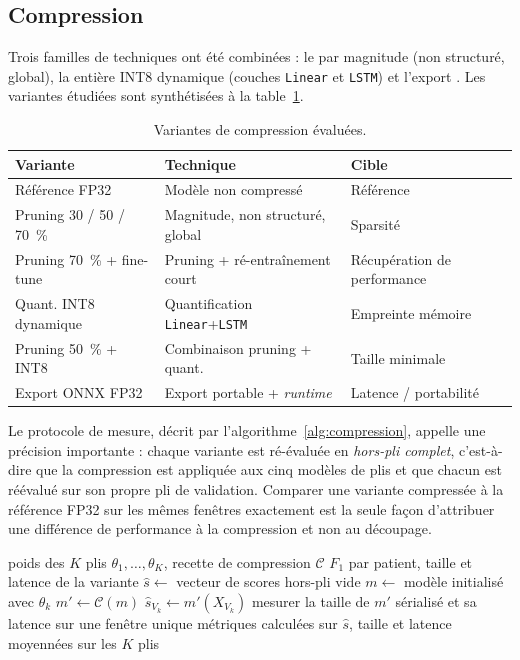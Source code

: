 \subsection{Compression}
Trois familles de techniques ont été combinées : le  par magnitude (non structuré, global), la  entière INT8 dynamique (couches \texttt{Linear} et \texttt{LSTM}) et l'export . Les variantes étudiées sont synthétisées à la table~\ref{tab:meth:compression}.

\begin{table}[H]
  \centering
  \caption{Variantes de compression évaluées.}
  \label{tab:meth:compression}
  \begin{tabular}{lll}
    \toprule
    \textbf{Variante} & \textbf{Technique} & \textbf{Cible} \\
    \midrule
    Référence FP32              & Modèle non compressé              & Référence \\
    Pruning 30 / 50 / 70~\%     & Magnitude, non structuré, global  & Sparsité \\
    Pruning 70~\% + fine-tune   & Pruning + ré-entraînement court   & Récupération de performance \\
    Quant. INT8 dynamique       & Quantification \texttt{Linear}+\texttt{LSTM} & Empreinte mémoire \\
    Pruning 50~\% + INT8        & Combinaison pruning + quant.      & Taille minimale \\
    Export ONNX FP32            & Export portable + \textit{runtime} & Latence / portabilité \\
    \bottomrule
  \end{tabular}
\end{table}

Le protocole de mesure, décrit par l'algorithme~\ref{alg:compression}, appelle une précision importante : chaque variante est ré-évaluée en \emph{hors-pli complet}, c'est-à-dire que la compression est appliquée aux cinq modèles de plis et que chacun est réévalué sur son propre pli de validation. Comparer une variante compressée à la référence FP32 sur les mêmes fenêtres exactement est la seule façon d'attribuer une différence de performance à la compression et non au découpage.

\begin{algorithm}[H]
\caption{Évaluation d'une variante de compression}
\label{alg:compression}
\begin{algorithmic}[1]
\Require poids des \(K\) plis \(\theta_1, \dots, \theta_K\), recette de compression \(\mathcal{C}\)
\Ensure \(F_1\) par patient, taille et latence de la variante
\State \(\hat{s} \gets\) vecteur de scores hors-pli vide
  \State \(m \gets\) modèle initialisé avec \(\theta_k\)
  \State \(m' \gets \mathcal{C}(m)\) 
  \State \(\hat{s}_{V_k} \gets m'(X_{V_k})\) 
  \State mesurer la taille de \(m'\) sérialisé et sa latence sur une fenêtre unique
\EndFor
\State \Return métriques calculées sur \(\hat{s}\), taille et latence moyennées sur les \(K\) plis
\end{algorithmic}
\end{algorithm}

